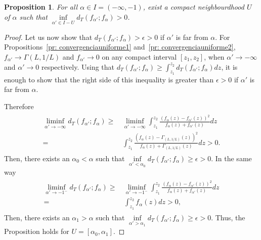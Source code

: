 \documentclass[technote,onecolumn,draftcls,12pt]{IEEEtran}
\newtheorem{proposition}{Proposition}
\numberwithin{equation}{section}
\newenvironment{dem}[1][Proof]{\begin{proof}[{\it #1}]}{\end{proof}}
\newcommand{\al}{&\,}
\newcommand{\pa}[1]{\ensuremath{\left( #1 \right)}}
\begin{document}
\begin{proposition}
	\label{pr: falpha>0}
	For all $\alpha\in I=(-\infty,-1)$, exist a compact neighbourdhood $U$ of $\alpha$ such that
	$\inf\limits_{\alpha'\in I-U}d_{T}({f_{\alpha'};f_{\alpha}})>0$.
\end{proposition}
\begin{dem}
	Let us now show that $d_{T}({f_{\alpha'};f_{\alpha}})>\epsilon>0$ if $\alpha'$ is far from $\alpha$. For Propositions~\ref{pr: convergenciauniforme1} and~\ref{pr: convergenciauniforme2}, $f_{\alpha'} \to \Gamma(L,1/L)$ and $f_{\alpha'} \to 0$ on any compact interval $[z_1,z_2]$, when $\alpha' \to -\infty$ and $\alpha' \to 0$ respectively.
	Using that $d_{T}\pa{f_{\alpha'};f_{\alpha}} \ge \int_{z_{1}}^{z_{2}}d_{T}\pa{f_{\alpha'};f_{\alpha}}dz$, it is enough to show that the right side of this inequality is greater than $\epsilon>0$ if $\alpha'$ is far from $\alpha$.
	
	Therefore
	\begin{align*}
	\begin{split}
	\liminf_{\alpha'\to-\infty} d_{T}\pa{f_{\alpha'};f_{\alpha}} 
	\ge \al \liminf_{\alpha'\to-\infty}\int_{z_{1}}^{z_{2}}\frac{\pa{f_{\alpha}\pa{z}-f_{\alpha'}\pa{z}}^{2}}
	{f_{\alpha}\pa{z}+f_{\alpha'}\pa{z}}dz \\
	= \al \int_{z_{1}}^{z_{2}}\frac{\pa{f_{\alpha}\pa{z}-\Gamma_{(L,1/L)}\pa{z}}^{2}}
	{f_{\alpha}\pa{z}+\Gamma_{(L,1/L)}\pa{z}}dz >0.
	\end{split}
	\end{align*}
	Then, there exists an $\alpha_0 < \alpha$ such that $\inf\limits_{\alpha'<\alpha_0} d_{T}\pa{f_{\alpha'};f_{\alpha}} \ge \epsilon>0.$ 
	In the same way
	\begin{align*}
	\begin{split}
	\liminf_{\alpha'\to-1^{-}} d_{T}\pa{f_{\alpha'};f_{\alpha}} 
	\ge \al \liminf_{\alpha'\to-1^{-}}\int_{z_{1}}^{z_{2}}\frac{\pa{f_{\alpha}\pa{z}-f_{\alpha'}\pa{z}}^{2}}
	{f_{\alpha}\pa{z}+f_{\alpha'}\pa{z}}dz \\
	= \al \int_{z_{1}}^{z_{2}}f_{\alpha}\pa{z}dz >0,
	\end{split}
	\end{align*}
	Then, there exists an $\alpha_1>\alpha$ such that $\inf\limits_{\alpha'>\alpha_1} d_{T}\pa{f_{\alpha'};f_{\alpha}} \ge \epsilon>0.$ 
	Thus, the Proposition holds for $U=[\alpha_0,\alpha_1].$
\end{dem}
\end{document}
